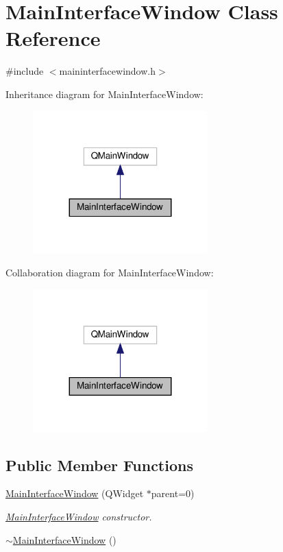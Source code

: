 \hypertarget{class_main_interface_window}{}\section{Main\+Interface\+Window Class Reference}
\label{class_main_interface_window}


{\ttfamily \#include $<$maininterfacewindow.\+h$>$}



Inheritance diagram for Main\+Interface\+Window\+:
\nopagebreak
\begin{figure}[H]
\begin{center}
\leavevmode
\includegraphics[width=191pt]{class_main_interface_window__inherit__graph}
\end{center}
\end{figure}


Collaboration diagram for Main\+Interface\+Window\+:
\nopagebreak
\begin{figure}[H]
\begin{center}
\leavevmode
\includegraphics[width=191pt]{class_main_interface_window__coll__graph}
\end{center}
\end{figure}
\subsection*{Public Member Functions}
\begin{DoxyCompactItemize}
\item 
\hyperlink{class_main_interface_window_a8b5aa367c51aca1da2c4e54ddf1571c1}{Main\+Interface\+Window} (Q\+Widget $\ast$parent=0)
\begin{DoxyCompactList}\small\item\em \hyperlink{class_main_interface_window}{Main\+Interface\+Window} constructor. \end{DoxyCompactList}\item 
\hyperlink{class_main_interface_window_a774d48e98f706047f8f12f5f961450d3}{$\sim$\+Main\+Interface\+Window} ()
\end{DoxyCompactItemize}
